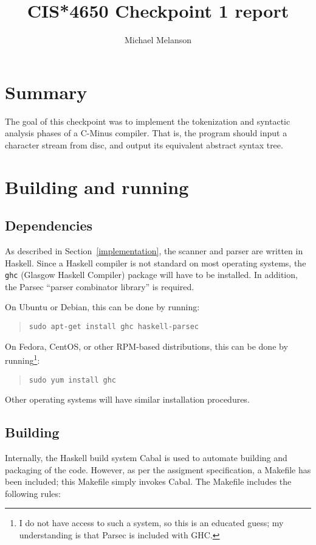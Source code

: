 \documentclass[12pt]{amsart}
\title{CIS*4650 Checkpoint 1 report}
\author{Michael Melanson}
\begin{document}
\maketitle

\section{Summary}
The goal of this checkpoint was to implement the tokenization and
syntactic analysis phases of a C-Minus compiler. That is, the program
should input a character stream from disc, and output its equivalent
abstract syntax tree.


\section{Building and running}

\subsection{Dependencies}
As described in Section~\ref{implementation}, the scanner and parser
are written in Haskell. Since a Haskell compiler is not standard on
most operating systems, the \verb|ghc| (Glasgow Haskell Compiler)
package will have to be installed. In addition, the Parsec ``parser
combinator library'' is required.

On Ubuntu or Debian, this can be done by running:
\begin{verse}
\verb|sudo apt-get install ghc haskell-parsec|
\end{verse}

On Fedora, CentOS, or other RPM-based distributions, this can be done
by running\footnote{I do not have access to such a system, so this is
  an educated guess; my understanding is that Parsec is included with
  GHC.}:
\begin{verse}
\verb|sudo yum install ghc|
\end{verse}

Other operating systems will have similar installation procedures.

\subsection{Building}
Internally, the Haskell build system Cabal is used to automate
building and packaging of the code. However, as per the assigment
specification, a Makefile has been included; this Makefile simply
invokes Cabal. The Makefile includes the following rules:
\end{document}

